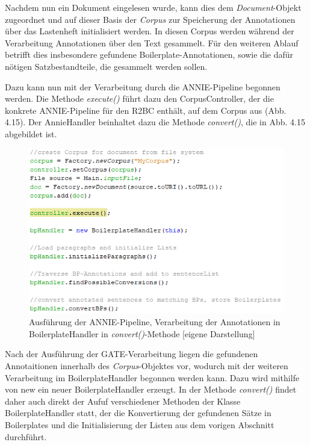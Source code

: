 \documentclass[12pt]{report}
\begin{document}
Nachdem nun ein Dokument eingelesen wurde, kann dies dem \textit{Document}-Objekt zugeordnet und auf dieser Basis der \textit{Corpus} zur Speicherung der Annotationen über das Lastenheft initialisiert werden. In diesen Corpus werden während der Verarbeitung Annotationen über den Text gesammelt. Für den weiteren Ablauf betrifft dies insbesondere gefundene Boilerplate-Annotationen, sowie die dafür nötigen Satzbestandteile, die gesammelt werden sollen. 

Dazu kann nun mit der Verarbeitung durch die ANNIE-Pipeline begonnen werden. Die Methode \textit{execute()} führt dazu den CorpusController, der die konkrete ANNIE-Pipeline für den R2BC enthält, auf dem Corpus aus (Abb. 4.15). Der AnnieHandler beinhaltet dazu die Methode \textit{convert()}, die in Abb. 4.15 abgebildet ist.

\begin{figure}[h!]
\begin{center}
\includegraphics[scale=1]{Bilder/AnnieHandler-execute.png}
\caption{Ausführung der ANNIE-Pipeline, Verarbeitung der Annotationen in BoilerplateHandler in \textit{convert()}-Methode [eigene Darstellung]}
\end{center}
\end{figure}

Nach der Ausführung der GATE-Verarbeitung liegen die gefundenen Annotaitionen innerhalb des \textit{Corpus}-Objektes vor, wodurch mit der weiteren Verarbeitung im BoilerplateHandler begonnen werden kann. Dazu wird mithilfe von new ein neuer BoilerplateHandler erzeugt.
In der Methode \textit{convert()} findet daher auch direkt der Aufuf verschiedener Methoden der Klasse BoilerplateHandler statt, der die Konvertierung der gefundenen Sätze in Boilerplates und die Initialisierung der Listen aus dem vorigen Abschnitt durchführt. 
\end{document}
